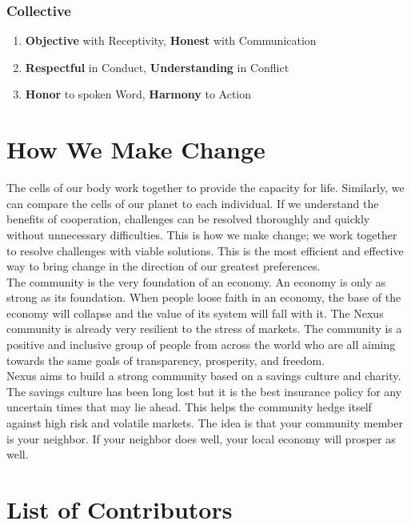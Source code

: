 \documentclass[11pt]{article}
\begin{document}
\subsubsection{Collective}

\begin{enumerate}
\item \textbf{Objective} with Receptivity, \textbf{Honest} with Communication
\item \textbf{Respectful} in Conduct, \textbf{Understanding} in Conflict
\item \textbf{Honor} to spoken Word, \textbf{Harmony} to Action
\end{enumerate}

\section{How We Make Change}

The cells of our body work together to provide the capacity for life. Similarly, we can compare the cells of our planet to each individual. 
If we understand the benefits of cooperation, challenges can be resolved thoroughly and quickly without unnecessary difficulties.
This is how we make change; we work together to resolve challenges with viable solutions.
This is the most efficient and effective way to bring change in the direction of our greatest preferences.\\

\noindent The community is the very foundation of an economy. An economy is only as strong as its foundation. 
When people loose faith in an economy, the base of the economy will collapse and the value of its system will fall with it. 
The Nexus community is already very resilient to the stress of markets. The community is a positive and inclusive group of people from across the world who are all aiming towards the same goals of transparency, prosperity, and freedom.\\ 

\noindent Nexus aims to build a strong community based on a savings culture and charity. 
The savings culture has been long lost but it is the best insurance policy for any uncertain times that may lie ahead. 
This helps the community hedge itself against high risk and volatile markets.
The idea is that your community member is your neighbor. If your neighbor does well, your local economy will prosper as well. 

\section{List of Contributors}
\end{document}
